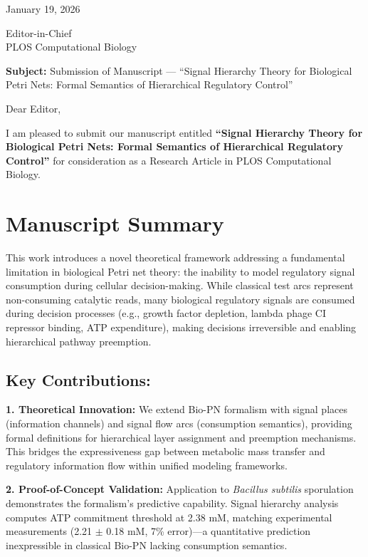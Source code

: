 \documentclass[11pt,letterpaper]{article}
\begin{document}
\pagestyle{empty}

\noindent
January 19, 2026

\vspace{12pt}

\noindent
Editor-in-Chief\\
PLOS Computational Biology

\vspace{12pt}

\noindent
\textbf{Subject:} Submission of Manuscript --- ``Signal Hierarchy Theory for Biological Petri Nets: Formal Semantics of Hierarchical Regulatory Control''

\vspace{12pt}

Dear Editor,

I am pleased to submit our manuscript entitled \textbf{``Signal Hierarchy Theory for Biological Petri Nets: Formal Semantics of Hierarchical Regulatory Control''} for consideration as a Research Article in PLOS Computational Biology.

\section*{Manuscript Summary}

This work introduces a novel theoretical framework addressing a fundamental limitation in biological Petri net theory: the inability to model regulatory signal consumption during cellular decision-making. While classical test arcs represent non-consuming catalytic reads, many biological regulatory signals are consumed during decision processes (e.g., growth factor depletion, lambda phage CI repressor binding, ATP expenditure), making decisions irreversible and enabling hierarchical pathway preemption.

\subsection*{Key Contributions:}

\textbf{1. Theoretical Innovation:} We extend Bio-PN formalism with signal places (information channels) and signal flow arcs (consumption semantics), providing formal definitions for hierarchical layer assignment and preemption mechanisms. This bridges the expressiveness gap between metabolic mass transfer and regulatory information flow within unified modeling frameworks.

\textbf{2. Proof-of-Concept Validation:} Application to \textit{Bacillus subtilis} sporulation demonstrates the formalism's predictive capability. Signal hierarchy analysis computes ATP commitment threshold at 2.38 mM, matching experimental measurements (2.21 $\pm$ 0.18 mM, 7\% error)---a quantitative prediction inexpressible in classical Bio-PN lacking consumption semantics.
\end{document}
